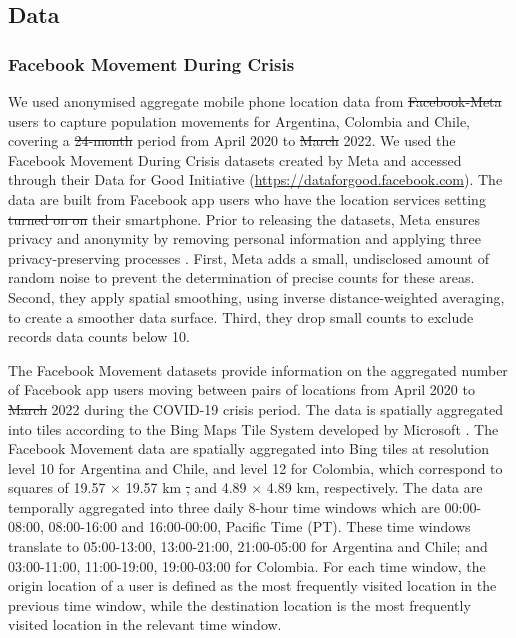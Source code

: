 \documentclass[fleqn,10pt]{wlscirep}
\providecommand{\DIFadd}[1]{{\protect\color{blue}\uwave{#1}}} %
\providecommand{\DIFdel}[1]{{\protect\color{red}\sout{#1}}}                      %
\providecommand{\DIFaddbegin}{} %
\providecommand{\DIFaddend}{} %
\providecommand{\DIFdelbegin}{} %
\providecommand{\DIFdelend}{} %
\begin{document}
\subsection*{Data}

\subsubsection*{Facebook Movement During Crisis}

We used anonymised aggregate mobile phone location data from \DIFdelbegin \DIFdel{Facebook-Meta }\DIFdelend \DIFaddbegin \DIFadd{Meta-Facebook }\DIFaddend users to capture population movements for Argentina, Colombia and Chile, covering a \DIFdelbegin \DIFdel{24-month }\DIFdelend \DIFaddbegin \DIFadd{26-month }\DIFaddend period from April 2020 to \DIFdelbegin \DIFdel{March }\DIFdelend \DIFaddbegin \DIFadd{May }\DIFaddend 2022. We used the Facebook Movement During Crisis datasets created by Meta and accessed through their Data for Good Initiative (\href{https://dataforgood.facebook.com}{https://dataforgood.facebook.com}). The data are built from Facebook app users who have the location services setting \DIFdelbegin \DIFdel{turned on on }\DIFdelend \DIFaddbegin \DIFadd{activated on }\DIFaddend their smartphone. Prior to releasing the datasets, Meta ensures privacy and anonymity by removing personal information and applying three privacy-preserving processes \cite{Maas19}. First, Meta adds a small, undisclosed amount of random noise to prevent the determination of precise counts for these areas.
Second, they apply spatial smoothing, using inverse distance-weighted averaging, to create a smoother data surface. Third, they drop small counts to exclude records data counts below 10.

The Facebook Movement datasets provide information on the aggregated number of Facebook app users moving between pairs of locations from April 2020 to \DIFdelbegin \DIFdel{March }\DIFdelend \DIFaddbegin \DIFadd{May }\DIFaddend 2022 during the COVID-19 crisis period. The data is spatially aggregated into tiles according to the Bing Maps Tile System developed by Microsoft \cite{MicrosoftBingMaps}. The Facebook Movement data are spatially aggregated into Bing tiles at resolution level 10 for Argentina and Chile, and level 12 for Colombia, which correspond to squares of 19.57 $\times$ 19.57 km \DIFdelbegin \DIFdel{, }\DIFdelend and 4.89 $\times$ 4.89 km, respectively. The data are temporally aggregated into three daily 8-hour time windows which are 00:00-08:00, 08:00-16:00 and 16:00-00:00, Pacific Time (PT).
These time windows translate to 05:00-13:00, 13:00-21:00, 21:00-05:00 for Argentina and Chile; and 03:00-11:00, 11:00-19:00, 19:00-03:00 for Colombia. For each time window, the origin location of a user is defined as the most frequently visited location in the previous time window, while the destination location is the most frequently visited location in the relevant time window.
\end{document}
